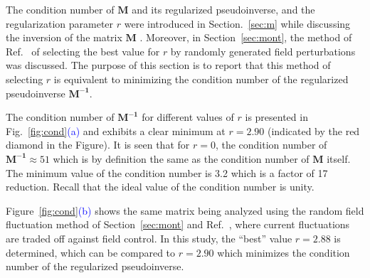 The condition number of $\bm{M}$ and its regularized pseudoinverse,
and the regularization parameter $r$ were introduced in
Section.~\ref{sec:m} while discussing the inversion of the matrix
$\bm{M}$ . Moreover, in Section~\ref{sec:mont}, the method of
Ref.~\cite{bea} of selecting the best value for $r$ by randomly
generated field perturbations was discussed.  The purpose of this
section is to report that this method of selecting $r$ is equivalent
to minimizing the condition number of the regularized pseudoinverse
$\bm{M^{-1}}$.

 


The condition number of $\bm{M^{-1}}$ for different values of $r$ is
presented in Fig.~\ref{fig:cond}\textcolor{blue}{(a)} and exhibits a
clear minimum at $r=2.90$ (indicated by the red diamond in the
Figure).  It is seen that for $r=0$, the condition number of
$\bm{M^{-1}}\approx 51$ which is by definition the same as the
condition number of $\bm{M}$ itself.  The minimum value of the
condition number is 3.2 which is a factor of 17 reduction.  Recall
that the ideal value of the condition number is unity.

Figure~\ref{fig:cond}\textcolor{blue}{(b)} shows the same matrix being
analyzed using the random field fluctuation method of
Section~\ref{sec:mont} and Ref.~\cite{bea}, where current fluctuations
are traded off against field control.  In this study, the ``best''
value $r=2.88$ is determined, which can be compared to $r=2.90$ which
minimizes the condition number of the regularized pseudoinverse.

